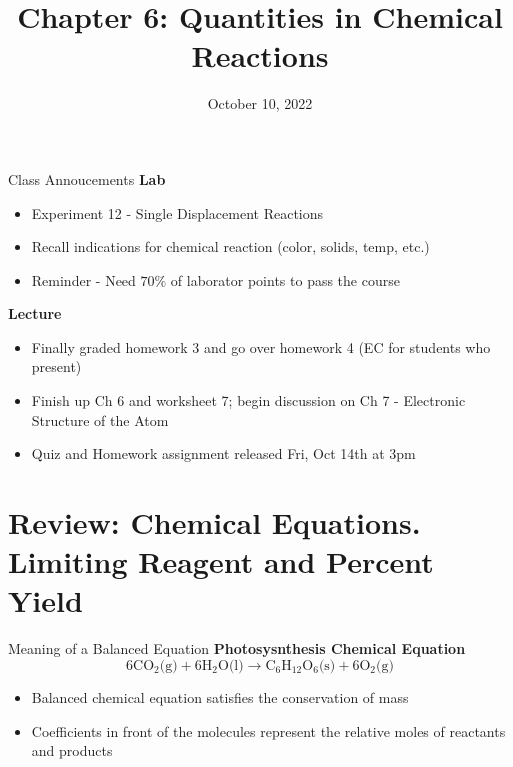 \documentclass[11pt]{beamer}
\title{Chapter 6: Quantities in Chemical Reactions}
\institute{Chemistry Department, Cypress College}
\date{October 10, 2022}
\begin{document}
\begin{frame}
  \titlepage
\end{frame}

\begin{frame}{Class Annoucements}
  \textbf{Lab}
  \begin{itemize}
  \item Experiment 12 - Single Displacement Reactions
  \item Recall indications for chemical reaction (color, solids,
    temp, etc.)
  \item Reminder - Need $70\%$ of laborator points to pass the course
  \end{itemize}
  
  \textbf{Lecture}
  \begin{itemize}
  \item Finally graded homework 3 and go over homework 4 (EC for
    students who present)
  \item Finish up Ch 6 and worksheet 7; begin discussion on Ch 7
    - Electronic Structure of the Atom
  \item Quiz and Homework assignment released Fri, Oct 14th at 3pm
  \end{itemize}
\end{frame}

\section{Review: Chemical Equations. Limiting Reagent and Percent Yield}

\begin{frame}{Meaning of a Balanced Equation}
  \textbf{Photosysnthesis Chemical Equation}
  \begin{equation}
    6\text{CO$_2$(g)} + 6\text{H$_2$O(l)} \rightarrow \text{C$_6$H$_{12}$O$_6$(s)}
    + 6\text{O$_2$(g)}
  \end{equation}
  
  \begin{itemize}
  \item Balanced chemical equation satisfies the conservation of mass
  \item Coefficients in front of the molecules represent the relative
    moles of reactants and products
  \end{itemize}
\end{frame}
\end{document}
